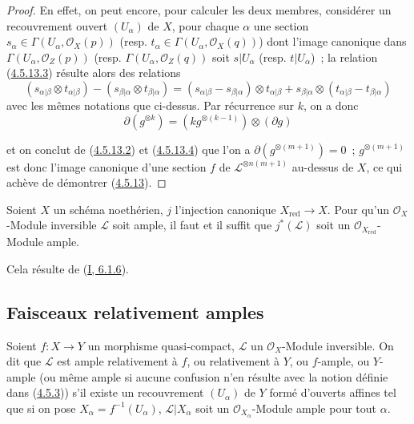 \begin{proof}
En effet, on peut encore, pour calculer les deux membres, considérer un
recouvrement ouvert $(U_\alpha)$ de $X$, pour chaque $\alpha$ une section
$s_\alpha\in\Gamma(U_\alpha,\mathcal{O}_X(p))$ (resp.
$t_\alpha\in\Gamma(U_\alpha,\mathcal{O}_X(q))$) dont l'image canonique dans
$\Gamma(U_\alpha,\mathcal{O}_Z(p))$ (resp.
$\Gamma(U_\alpha,\mathcal{O}_Z(q))$ soit $s|U_\alpha$ (resp.
$t|U_\alpha$)~; la relation
(\hyperref[II.4.5.13.3-fr]{4.5.13.3}) résulte alors des relations
\[
  (s_{\alpha|\beta}\otimes t_{\alpha|\beta})
  -(s_{\beta|\alpha}\otimes t_{\beta|\alpha})
  =(s_{\alpha|\beta}-s_{\beta|\alpha})\otimes t_{\alpha|\beta}
  +s_{\beta|\alpha}\otimes(t_{\alpha|\beta}-t_{\beta|\alpha})
\]
avec les mêmes notations que ci-dessus. Par récurrence sur $k$, on a donc
\begin{equation}
\label{II.4.5.13.4-fr}
  \partial(g^{\otimes k})=(kg^{\otimes(k-1)})\otimes(\partial g)
\tag{4.5.13.4}
\end{equation}


et on conclut de (\hyperref[II.4.5.13.2-fr]{4.5.13.2}) et
(\hyperref[II.4.5.13.4-fr]{4.5.13.4}) que l'on a
$\partial(g^{\otimes(m+1)})=0$~; $g^{\otimes(m+1)}$ est donc l'image
canonique d'une section $f$ de $\mathcal{L}^{\otimes n(m+1)}$ au-dessus de
$X$, ce qui achève de démontrer (\hyperref[II.4.5.13-fr]{4.5.13}).
\end{proof}

\begin{corollary}[4.5.14]
\label{II.4.5.14-fr}
Soient $X$ un schéma noethérien, $j$ l'injection canonique
$X_{\mathrm{red}}\to X$. Pour qu'un $\mathcal{O}_X$-Module inversible
$\mathcal{L}$ soit ample, il faut et il suffit que $j^*(\mathcal{L})$ soit
un $\mathcal{O}_{X_{\mathrm{red}}}$-Module ample.
\end{corollary}

Cela résulte de (\hyperref[I.6.1.6-fr]{I, 6.1.6}).

\subsection{Faisceaux relativement amples}
\label{II.4.6-fr}

\begin{definition}[4.6.1]
\label{II.4.6.1-fr}
Soient $f:X\to Y$ un morphisme quasi-compact, $\mathcal{L}$ un
$\mathcal{O}_X$-Module inversible. On dit que $\mathcal{L}$ est ample
relativement à $f$, ou relativement à $Y$, ou $f$-ample, ou $Y$-ample (ou
même ample si aucune confusion n'en résulte avec la notion définie dans
(\hyperref[II.4.5.3-fr]{4.5.3})) s'il existe un recouvrement $(U_\alpha)$
de $Y$ formé d'ouverts affines tel que si on pose
$X_\alpha=f^{-1}(U_\alpha)$, $\mathcal{L}|X_\alpha$ soit un
$\mathcal{O}_{X_\alpha}$-Module ample pour tout $\alpha$.
\end{definition}

